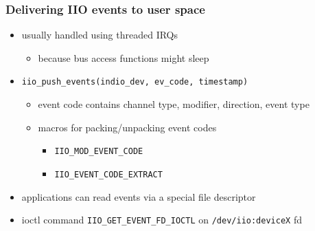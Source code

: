 \documentclass[aspectratio=169]{beamer}
\begin{document}
\begin{frame}
\frametitle{Delivering IIO events to user space}
\begin{itemize}
    \item usually handled using threaded IRQs
    \begin{itemize}
        \item because bus access functions might sleep
    \end{itemize}
    \item \texttt{iio\_push\_events(indio\_dev, ev\_code, timestamp)}
    \begin{itemize}
        \item event code contains channel type, modifier, direction, event type
        \item macros for packing/unpacking event codes
        \begin{itemize}
            \item \texttt{IIO\_MOD\_EVENT\_CODE}
            \item \texttt{IIO\_EVENT\_CODE\_EXTRACT}
        \end{itemize}
    \end{itemize}
    \item applications can read events via a special file descriptor
    \item ioctl command \texttt{IIO\_GET\_EVENT\_FD\_IOCTL} on \texttt{/dev/iio:deviceX} fd
\end{itemize}
\end{frame}



%


\end{document}
